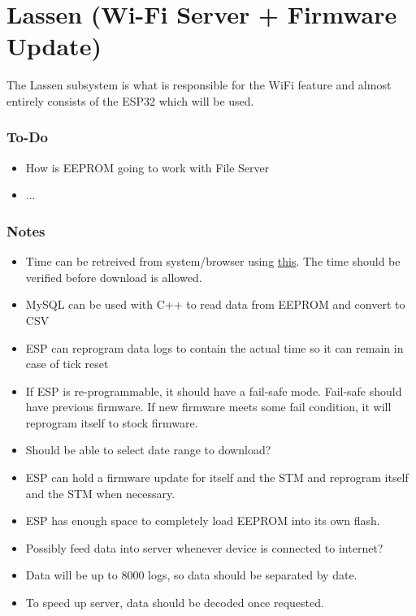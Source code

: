\documentclass{article}
\begin{document}
\pagebreak















\section{Lassen (Wi-Fi Server + Firmware Update)}
The Lassen subsystem is what is responsible for the WiFi feature and almost entirely consists of the ESP32 which will be used.
\subsubsection{To-Do}
\begin{itemize}
    \item How is EEPROM going to work with File Server
    \item ...
\end{itemize}

\subsubsection{Notes}
\begin{itemize}
    \item Time can be retreived from system/browser using \href{https://www.plus2net.com/javascript_tutorial/clock.php}{this}. The time should be verified before download is allowed.
    \item MySQL can be used with C++ to read data from EEPROM and convert to CSV
    \item ESP can reprogram data logs to contain the actual time so it can remain in case of tick reset
    \item If ESP is re-programmable, it should have a fail-safe mode. Fail-safe should have previous firmware. If new firmware meets some fail condition, it will reprogram itself to stock firmware.
    \item Should be able to select date range to download?
    \item ESP can hold a firmware update for itself and the STM and reprogram itself and the STM when necessary.
    \item ESP has enough space to completely load EEPROM into its own flash.
    \item Possibly feed data into server whenever device is connected to internet?
    \item Data will be up to 8000 logs, so data should be separated by date.
    \item To speed up server, data should be decoded once requested.
\end{itemize}
\end{document}
